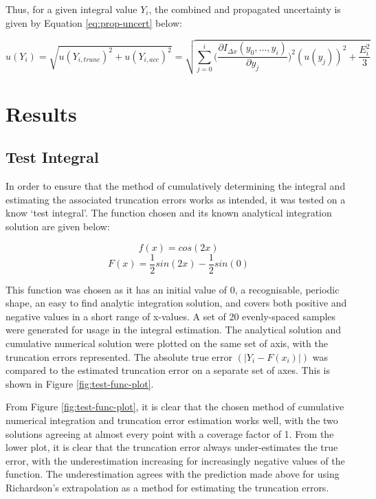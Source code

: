 \documentclass{article}
\begin{document}
        Thus, for a given integral value $Y_i$, the combined and propagated uncertainty is given by Equation \ref{eq:prop-uncert} below:

        \begin{equation}
            u(Y_i) = \sqrt{u(Y_{i, trunc})^2 + u(Y_{i, acc})^2} = \sqrt{ \sum^i_{j = 0} \Biggl( \frac{\partial I_{\Delta x}(y_0, ..., y_i)}{\partial y_j} \Biggr)^2 (u(y_j))^2 
            + \frac{E_i^2}{3} }
            \label{eq:prop-uncert}
        \end{equation}

\section*{Results}

    \subsection*{Test Integral}

        In order to ensure that the method of cumulatively determining the integral and estimating the associated truncation errors works as intended, it was tested on a know `test integral'. The function chosen and its known analytical integration solution are given below:

        \begin{equation}
            f(x) = cos(2x)
            \label{eq:test-func}
        \end{equation}
        \begin{equation}
            F(x) = \frac{1}{2}sin(2x) - \frac{1}{2}sin(0)
            \label{eq:test-int}
        \end{equation}

        This function was chosen as it has an initial value of 0, a recognisable, periodic shape, an easy to find analytic integration solution, and covers both positive and negative values in a short range of x-values. A set of 20 evenly-spaced samples were generated for usage in the integral estimation. The analytical solution and cumulative numerical solution were plotted on the same set of axis, with the truncation errors represented. The absolute true error $(| Y_i - F(x_i) |)$ was compared to the estimated truncation error on a separate set of axes. This is shown in Figure \ref{fig:test-func-plot}.

        From Figure \ref{fig:test-func-plot}, it is clear that the chosen method of cumulative numerical integration and truncation error estimation works well, with the two solutions agreeing at almost every point with a coverage factor of 1. From the lower plot, it is clear that the truncation error always under-estimates the true error, with the underestimation increasing for increasingly negative values of the function. The underestimation agrees with the prediction made above for using Richardson's extrapolation as a method for estimating the truncation errors.
\end{document}
